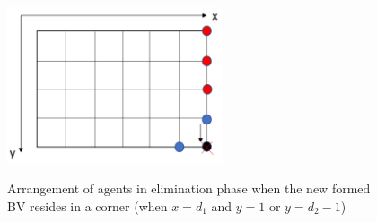 \begin{itemize}
\begin{figure} [H]
{    \includegraphics[width=2.5in]{figures/meshcorner4.png}}
    \caption{Arrangement of agents in elimination phase when the new formed BV resides in a corner (when $x=d_1$ and $y=1$ or $y=d_2-1$)} 
  \label{fig:subfigmesh4} %
\end{figure}
\end{itemize}

